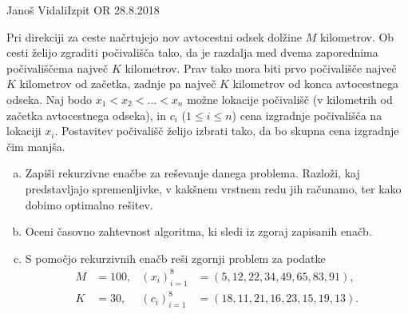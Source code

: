 \begin{naloga}{Janoš Vidali}{Izpit OR 28.8.2018}
\begin{vprasanje}
Pri direkciji za ceste načrtujejo nov avtocestni odsek dolžine $M$ kilometrov.
Ob cesti želijo zgraditi počivališča tako,
da je razdalja med dvema zaporednima počivališčema največ $K$ kilometrov.
Prav tako mora biti prvo počivališče največ $K$ kilometrov od začetka,
zadnje pa največ $K$ kilometrov od konca avtocestnega odseka.
Naj bodo $x_1 < x_2 < \dots < x_n$ možne lokacije počivališč
(v kilometrih od začetka avtocestnega odseka),
in $c_i$ ($1 \le i \le n$) cena izgradnje počivališča na lokaciji $x_i$.
Postavitev počivališč želijo izbrati tako,
da bo skupna cena izgradnje čim manjša.

\begin{enumerate}[(a)]
\item Zapiši rekurzivne enačbe za reševanje danega problema.
Razloži, kaj pred\-stav\-lja\-jo spremenljivke,
v kakšnem vrstnem redu jih računamo, ter kako dobimo optimalno rešitev.

\item Oceni časovno zahtevnost algoritma, ki sledi iz zgoraj zapisanih enačb.

\item S pomočjo rekurzivnih enačb reši zgornji problem za podatke
\begin{align*}
M &= 100, & (x_i)_{i=1}^8 &= ( 5, 12, 22, 34, 49, 65, 83, 91), \\
K &= 30,  & (c_i)_{i=1}^8 &= (18, 11, 21, 16, 23, 15, 19, 13).
\end{align*}
\end{enumerate}
\end{vprasanje}
\begin{odgovor}
\end{odgovor}
\end{naloga}

